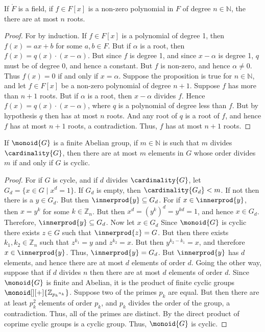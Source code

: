     \begin{theorem}
        If $\ring{F}$ is a field, if $f\in{F}[x]$ is a non-zero polynomial
        in $F$ of degree $n\in\mathbb{N}$, the there are at most $n$ roots.
    \end{theorem}
    \begin{proof}
        For by induction. If $f\in{F}[x]$ is a polynomial of degree 1, then
        $f(x)=ax+b$ for some $a,b\in{F}$. But if $\alpha$ is a root, then
        $f(x)=q(x)\cdot(x-\alpha)$. But since $f$ is degree 1, and since
        $x-\alpha$ is degree 1, $q$ must be of degree 0, and hence a
        constant. But $f$ is non-zero, and hence $\alpha\ne{0}$. Thus
        $f(x)=0$ if and only if $x=\alpha$. Suppose the proposition is true
        for $n\in\mathbb{N}$, and let $f\in{F}[x]$ be a non-zero polynomial
        of degree $n+1$. Suppose $f$ has more than $n+1$ roots. But if
        $\alpha$ is a root, then $x-\alpha$ divides $f$. Hence
        $f(x)=q(x)\cdot(x-\alpha)$, where $q$ is a polynomial of degree less
        than $f$. But by hypothesis $q$ then has at most $n$ roots. And any
        root of $q$ is a root of $f$, and hence $f$ has at most $n+1$ roots,
        a contradiction. Thus, $f$ has at most $n+1$ roots.
    \end{proof}
    \begin{theorem}
        If $\monoid{G}$ is a finite Abelian group, if $m\in\mathbb{N}$ is
        such that $m$ divides $\cardinality{G}$, then there are at most
        $m$ elements in $G$ whose order divides $m$ if and only if $G$ is
        cyclic.
    \end{theorem}
    \begin{proof}
        For if $G$ is cycle, and if $d$ divides $\cardinality{G}$, let
        $G_{d}=\{x\in{G}\;|\;x^{d}=1\}$. If $G_{d}$ is empty, then
        $\cardinality{G_{d}}<m$. If not then there is a $y\in{G}_{d}$.
        But then $\innerprod{y}\subseteq{G}_{d}$. For if
        $x\in\innerprod{y}$, then $x=y^{k}$ for some $k\in\mathbb{Z}_{n}$.
        But then $x^{d}=(y^{k})^{d}=y^{kd}=1$, and hence $x\in{G}_{d}$.
        Therefore, $\innerprod{y}\subseteq{G}_{d}$. Now let $x\in{G}_{d}$
        Since $\monoid{G}$ is cyclic there exists $z\in{G}$ such that
        $\innerprod{z}=G$. But then there exists
        $k_{1},k_{2}\in\mathbb{Z}_{n}$ such that $z^{k_{1}}=y$ and
        $z^{k_{2}}=x$. But then $y^{k_{2}-k_{1}}=x$, and therefore
        $x\in\innerprod{y}$. Thus, $\innerprod{y}=G_{d}$. But
        $\innerprod{y}$ has $d$ elements, and hence there are at most $d$
        elements of order $d$. Going the other way, suppose that if $d$
        divides $n$ then there are at most $d$ elements of order $d$.
        Since $\monoid{G}$ is finite and Abelian, it is the product of
        finite cyclic groups $\monoid[][+]{\mathbb{Z}_{{p_{k}}^{n_{k}}}}$.
        Suppose two of the primes $p_{k}$ are equal. But then there are at
        least $p_{k}^{2}$ elements of order $p_{k}$, and $p_{k}$ divides the
        order of the group, a contradiction. Thus, all of the primes are
        distinct. By the direct product of coprime cyclic groups is a cyclic
        group. Thus, $\monoid{G}$ is cyclic.
    \end{proof}
